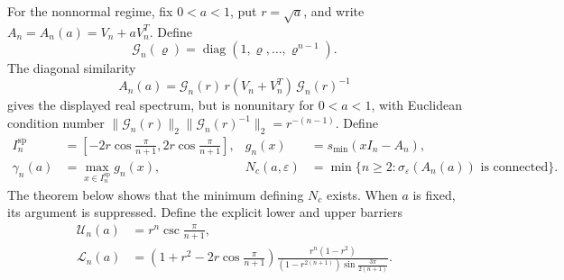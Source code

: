 \documentclass[11pt,a4paper]{article}
\numberwithin{equation}{section}
\DeclareMathOperator{\diag}{diag}
\begin{document}
For the nonnormal regime, fix
\(0<a<1\), put \(r=\sqrt a\), and write
\(A_n=A_n(a)=V_n+aV_n^T\).  Define
\[
 \mathcal G_n(\varrho)=\diag(1,\varrho,\ldots,\varrho^{n-1}).
\]
The diagonal similarity
\begin{equation}\label{eq:intro-similarity}
 A_n(a)=\mathcal G_n(r)\,r(V_n+V_n^T)\,\mathcal G_n(r)^{-1}
\end{equation}
gives the displayed real spectrum, but is nonunitary for \(0<a<1\), with
Euclidean condition number
\(\lVert\mathcal G_n(r)\rVert_2
 \lVert\mathcal G_n(r)^{-1}\rVert_2=r^{-(n-1)}\).
Define
\[
 \begin{aligned}
 I_n^{\mathrm{sp}}
 &=\left[-2r\cos\frac{\pi}{n+1},2r\cos\frac{\pi}{n+1}\right],
 &g_n(x)&=s_{\min}(xI_n-A_n),\\
 \gamma_n(a)&=\max_{x\in I_n^{\mathrm{sp}}}g_n(x),
 &N_c(a,\varepsilon)&=\min\{n\geq2:
 \sigma_\varepsilon(A_n(a))\text{ is connected}\}.
 \end{aligned}
\]
The theorem below shows that the minimum defining \(N_c\) exists.  When
\(a\) is fixed, its argument is suppressed.  Define the explicit lower and
upper barriers
\begin{align}
 \mathcal U_n(a)&=r^n\csc\frac{\pi}{n+1},\label{eq:main-U-def}\\
 \mathcal L_n(a)&=
 \left(1+r^2-2r\cos\frac{\pi}{n+1}\right)
 \frac{r^n(1-r^2)}
 {(1-r^{2(n+1)})\sin\frac{3\pi}{2(n+1)}}.\label{eq:main-L-def}
\end{align}
\end{document}
